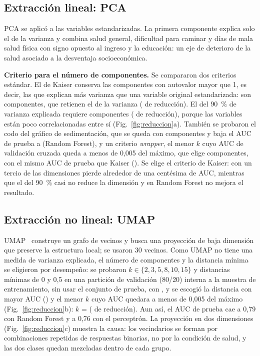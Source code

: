 \documentclass[journal]{IEEEtran}
\begin{document}
\subsection{Extracción lineal: PCA}
PCA se aplicó a las variables estandarizadas. La primera componente explica solo el \pcaPcUno{} de la varianza y combina salud general, dificultad para caminar y días de mala salud física con signo opuesto al ingreso y la educación: un eje de deterioro de la salud asociado a la desventaja socioeconómica.

\textbf{Criterio para el número de componentes.} Se compararon dos criterios estándar. El de Kaiser conserva las componentes con autovalor mayor que 1, es decir, las que explican más varianza que una variable original estandarizada: son \pcaKaiser{} componentes, que retienen el \pcaVarKaiser{} de la varianza (\pcaRedKaiser{} de reducción). El del 90~\% de varianza explicada requiere \pcaNoventa{} componentes (\pcaRedNoventa{} de reducción), porque las variables están poco correlacionadas entre sí (Fig.~\ref{fig:reduccion}a). También se probaron el codo del gráfico de sedimentación, que se queda con \pcaCodo{} componentes y baja el AUC de prueba a \pcaAucCodoRF{} (Random Forest), y un criterio \emph{wrapper}, el menor $k$ cuyo AUC de validación cruzada queda a menos de 0,005 del máximo, que elige \pcaWrapper{} componentes, con el mismo AUC de prueba que Kaiser (\pcaAucWrapperRF). Se elige el criterio de Kaiser: con un tercio de las dimensiones pierde alrededor de una centésima de AUC, mientras que el del 90~\% casi no reduce la dimensión y en Random Forest no mejora el resultado.

\subsection{Extracción no lineal: UMAP}
UMAP~\cite{mcinnes2018} construye un grafo de vecinos y busca una proyección de baja dimensión que preserve la estructura local; se usaron 30 vecinos. Como UMAP no tiene una medida de varianza explicada, el número de componentes y la distancia mínima se eligieron por desempeño: se probaron $k \in \{2, 3, 5, 8, 10, 15\}$ y distancias mínimas de 0 y 0,5 en una partición de validación (80/20) interna a la muestra de entrenamiento, sin usar el conjunto de prueba, con \mejorUno, y se escogió la distancia con mayor AUC (\umapDist) y el menor $k$ cuyo AUC quedara a menos de 0,005 del máximo (Fig.~\ref{fig:reduccion}b): $k$ = \umapK{} (\umapRed{} de reducción). Aun así, el AUC de prueba cae a 0,79 con Random Forest y a 0,76 con el perceptrón. La proyección en dos dimensiones (Fig.~\ref{fig:reduccion}c) muestra la causa: los vecindarios se forman por combinaciones repetidas de respuestas binarias, no por la condición de salud, y las dos clases quedan mezcladas dentro de cada grupo.
\end{document}
